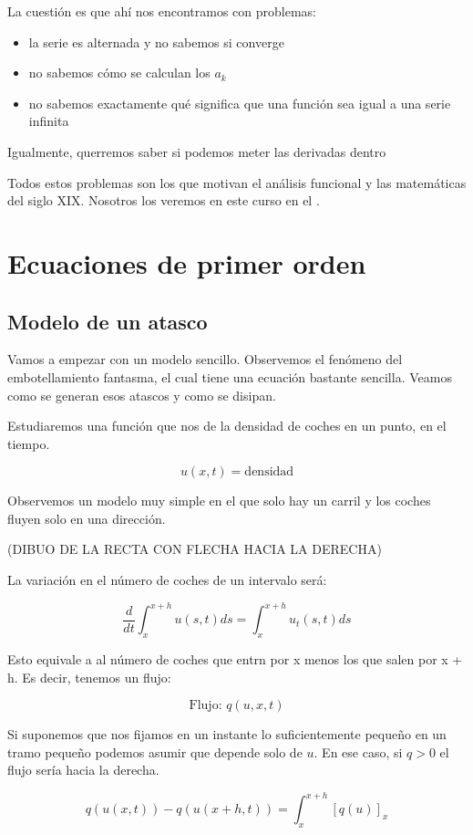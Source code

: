 \documentclass[palatino]{apuntes}
\begin{document}
La cuestión es que ahí nos encontramos con problemas:
\begin{itemize}
	\item la serie es alternada y no sabemos si converge
	\item no sabemos cómo se calculan los $a_k$
	\item no sabemos exactamente qué significa que una función sea igual a una serie infinita
\end{itemize}
Igualmente, querremos saber si podemos meter las derivadas dentro

Todos estos problemas son los que motivan el análisis funcional y las matemáticas del siglo XIX. Nosotros los veremos en este curso en el .

\chapter{Ecuaciones de primer orden}

\section{Modelo de un atasco}

Vamos a empezar con un modelo sencillo. Observemos el fenómeno del embotellamiento fantasma, el cual tiene una ecuación bastante sencilla. Veamos como se generan esos atascos y como se disipan.

Estudiaremos una función que nos de la densidad de coches en un punto, en el tiempo.

$$u(x,t) = \text{densidad}$$

Observemos un modelo muy simple en el que solo hay un carril y los coches fluyen solo en una dirección.

(DIBUO DE LA RECTA CON FLECHA HACIA LA DERECHA)

La variación en el número de coches de un intervalo será:

$$ \frac{d}{dt} \int^{x+h}_{x} u(s,t) ds = \int^{x+h}_{x} u_t(s,t) ds $$

Esto equivale a al número de coches que entrn por x menos los que salen por x + h. Es decir, tenemos un flujo:

$$\text{Flujo: } q(u, x, t)$$

Si suponemos que nos fijamos en un instante lo suficientemente pequeño en un tramo pequeño podemos asumir que depende solo de $u$. En ese caso, si $q > 0$ el flujo sería hacia la derecha.

$$ q(u(x,t)) - q(u(x+h,t)) = \int^{x+h}_{x} [q(u)]_{x} $$
\end{document}
